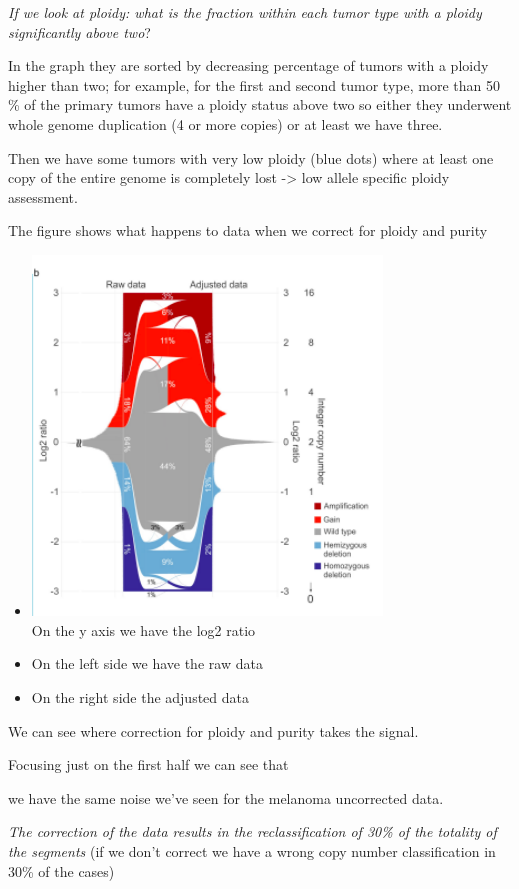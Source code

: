 \emph{If we look at ploidy: what is the fraction within each tumor type with a
ploidy significantly above two}?

In the graph they are sorted by decreasing percentage of tumors with a ploidy
higher than two; for example, for the first and second tumor type, more than 50
\% of the primary tumors have a ploidy status above two so either they underwent
whole genome duplication (4 or more copies) or at least we have three.

Then we have some tumors with very low ploidy (blue dots) where at least one
copy of the entire genome is completely lost -\textgreater{} low allele specific
ploidy assessment.

The figure shows what happens to data when we correct for ploidy and purity

\begin{itemize}
\item
  \includegraphics[width=3.65972in,height=3.76389in]{image10.png}\\
  On the y axis
  we have the log2 ratio
\item
  On the left side we have the raw data
\item
  On the right side the adjusted data
\end{itemize}

We can see where correction for ploidy and purity takes the signal.

Focusing just on the first half we can see that

we have the same noise we've seen for the melanoma uncorrected data.

\emph{The correction of the data results in the reclassification of 30\% of the
totality of the segments} (if we don't correct we have a wrong copy number
classification in 30\% of the cases)

